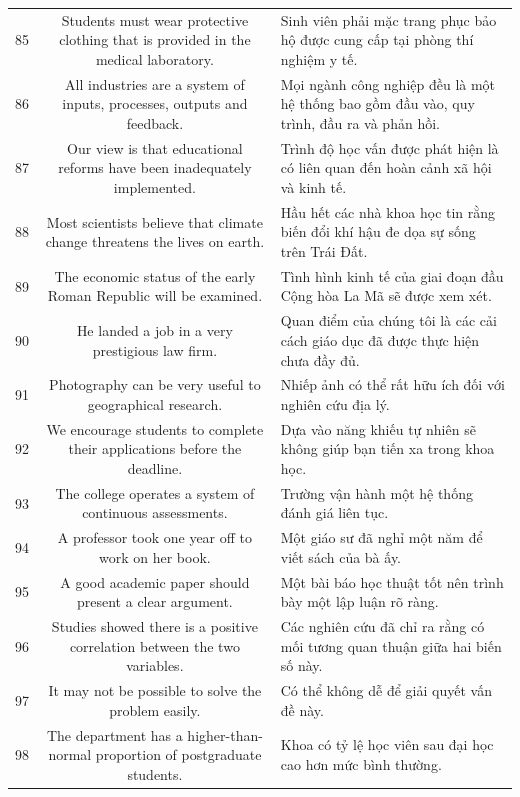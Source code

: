 \documentclass[11pt,a4paper]{article}
\begin{document}
\begin{longtable}{N S M}
85 & Students must wear protective clothing that is provided in the medical laboratory. & Sinh viên phải mặc trang phục bảo hộ được cung cấp tại phòng thí nghiệm y tế. \\
86 & All industries are a system of inputs, processes, outputs and feedback. & Mọi ngành công nghiệp đều là một hệ thống bao gồm đầu vào, quy trình, đầu ra và phản hồi. \\
87 & Our view is that educational reforms have been inadequately implemented. & Trình độ học vấn được phát hiện là có liên quan đến hoàn cảnh xã hội và kinh tế. \\
88 & Most scientists believe that climate change threatens the lives on earth. & Hầu hết các nhà khoa học tin rằng biến đổi khí hậu đe dọa sự sống trên Trái Đất. \\
89 & The economic status of the early Roman Republic will be examined. & Tình hình kinh tế của giai đoạn đầu Cộng hòa La Mã sẽ được xem xét. \\
90 & He landed a job in a very prestigious law firm. & Quan điểm của chúng tôi là các cải cách giáo dục đã được thực hiện chưa đầy đủ. \\
91 & Photography can be very useful to geographical research. & Nhiếp ảnh có thể rất hữu ích đối với nghiên cứu địa lý. \\
92 & We encourage students to complete their applications before the deadline. & Dựa vào năng khiếu tự nhiên sẽ không giúp bạn tiến xa trong khoa học. \\
93 & The college operates a system of continuous assessments. & Trường vận hành một hệ thống đánh giá liên tục. \\
94 & A professor took one year off to work on her book. & Một giáo sư đã nghỉ một năm để viết sách của bà ấy. \\
95 & A good academic paper should present a clear argument. & Một bài báo học thuật tốt nên trình bày một lập luận rõ ràng. \\
96 & Studies showed there is a positive correlation between the two variables. & Các nghiên cứu đã chỉ ra rằng có mối tương quan thuận giữa hai biến số này. \\
97 & It may not be possible to solve the problem easily. & Có thể không dễ để giải quyết vấn đề này. \\
98 & The department has a higher-than-normal proportion of postgraduate students. & Khoa có tỷ lệ học viên sau đại học cao hơn mức bình thường. \\

\end{longtable}
\end{document}
